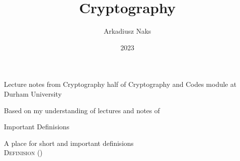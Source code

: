 \documentclass[12pt, letterpaper]{article}
\title{Cryptography}
\author{Arkadiusz Naks}
\date{2023}
\begin{document}
\begin{titlepage}
  \begin{center}
    \makeatletter
    \vspace*{1cm}
    \Huge
    \textbf{\@title}

    \vspace{0.5cm}
    \Large
    Lecture notes from Cryptography half of Cryptography and Codes module at Durham University

    \vspace{1.5cm}

    \textbf{\@author}

    \vfill

    \vspace{0.8cm}

    \small
    Based on my understanding of lectures and notes of \\
    \@date{}
  \end{center}
\end{titlepage}

\tableofcontents
\newpage

\begin{section}{Important Definisions}

  A place for short and important definisions \\

  \textsc{Definision} ()

\end{section}
\end{document}
